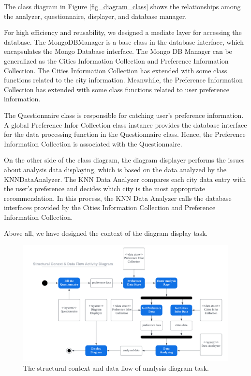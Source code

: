 \documentclass[conference]{IEEEtran}
\begin{document}
The class diagram in Figure \ref{fig_diagram_class} shows the relationships among the analyzer, questionnaire, displayer, and database manager. 

For high efficiency and reusability, we designed a mediate layer for accessing the database. The MongoDBManager is a base class in the database interface, which encapsulates the Mongo Database interface. The Mongo DB Manager can be generalized as the Cities Information Collection and Preference Information Collection. The Cities Information Collection has extended with some class functions related to the city information. Meanwhile, the Preference Information Collection has extended with some class functions related to user preference information.

The Questionnaire class is responsible for catching user's preference information. A global Preference Infor Collection class instance provides the database interface for the data processing function in the Questionnaire class. Hence, the Preference Information Collection is associated with the Questionnaire.

On the other side of the class diagram, the diagram displayer performs the issues about analysis data displaying, which is based on the data analyzed by the KNNDataAnalyzer. The KNN Data Analyzer compares each city data entry with the user's preference and decides which city is the most appropriate recommendation. In this process, the KNN Data Analyzer calls the database interfaces provided by the Cities Information Collection and Preference Information Collection.

Above all, we have designed the context of the diagram display task.



\begin{figure}[htbp]
\centerline{\includegraphics[width=1.0\textwidth]{diagram_data_flow.pdf}}
\caption{The structural context and data flow of analysis diagram task.}
\label{diagram_data_flow}
\end{figure}
\end{document}
